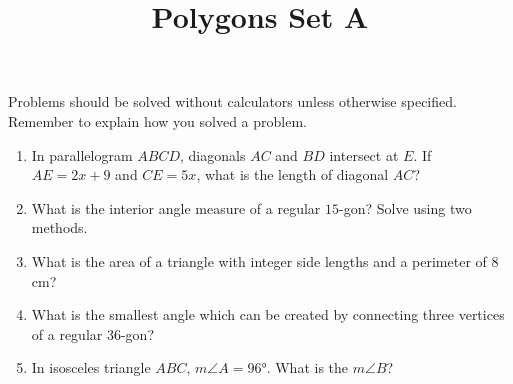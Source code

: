 \documentclass{article}
\title{Polygons Set A}
\author{}
\date{}
\begin{document}
\maketitle
\noindent Problems should be solved without calculators unless otherwise specified.
Remember to explain how you solved a problem.
\begin{multicols}{2}
    \begin{enumerate}
        \item In parallelogram $ABCD$, diagonals $AC$ and $BD$ intersect at $E$.
            If $AE = 2x + 9$ and $CE = 5x$, what is the length of diagonal $AC$?
            \vspace{3cm}
        \item What is the interior angle measure of a regular $15$-gon?
            Solve using two methods.
            \vspace{3cm}
        \item What is the area of a triangle with integer side lengths and a perimeter of $8$ cm?
            \vspace{3cm}
        \item What is the smallest angle which can be created by connecting three vertices of a regular $36$-gon?
            \vspace{3cm}
        \item In isosceles triangle $ABC$, $m\angle A = \ang{96}$.
            What is the $m\angle B$?
            \vspace{3cm}
    \end{enumerate}
\end{multicols}
\end{document}
